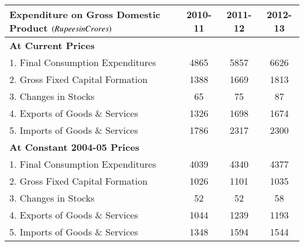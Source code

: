 \begin{tabular}{|l|c|c|c|}
\hline
Expenditure on Gross Domestic Product $\left(Rupees in Crores\right)$ & 2010-11 & 2011-12 & 2012-13 \\
\hline
\textbf{At Current Prices} & & & \\
1. Final Consumption Expenditures & 4865 & 5857 & 6626 \\
2. Gross Fixed Capital Formation & 1388 & 1669 & 1813 \\
3. Changes in Stocks & 65 & 75 & 87 \\
4. Exports of Goods \& Services & 1326 & 1698 & 1674 \\
5. Imports of Goods \& Services & 1786 & 2317 & 2300 \\
\hline
\textbf{At Constant 2004-05 Prices} & & & \\
1. Final Consumption Expenditures & 4039 & 4340 & 4377 \\
2. Gross Fixed Capital Formation & 1026 & 1101 & 1035 \\
3. Changes in Stocks & 52 & 52 & 58 \\
4. Exports of Goods \& Services & 1044 & 1239 & 1193 \\
5. Imports of Goods \& Services & 1348 & 1594 & 1544 \\

\hline
\end{tabular}